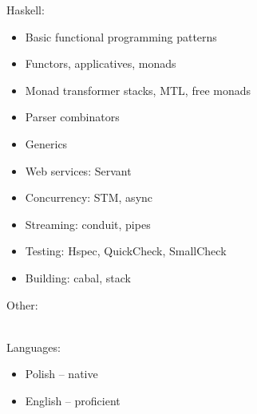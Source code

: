 \documentclass[8pt]{developercv} %
\begin{document}

\begin{minipage}[t]{0.5\textwidth}
  Haskell:
  \begin{itemize}
    \item Basic functional programming patterns
    \item Functors, applicatives, monads
    \item Monad transformer stacks, MTL, free monads
    \item Parser combinators
    \item Generics
    \item Web services: Servant
    \item Concurrency: STM, async
    \item Streaming: conduit, pipes
    \item Testing: Hspec, QuickCheck, SmallCheck
    \item Building: cabal, stack
  \end{itemize}
\end{minipage}
\begin{minipage}[t]{0.5\textwidth}
  Other:
  \begin{barchart}{5.5}
  \end{barchart}
  \\
  Languages:
  \begin{itemize}
    \item Polish -- native
    \item English -- proficient
  \end{itemize}
\end{minipage}


\end{document}
